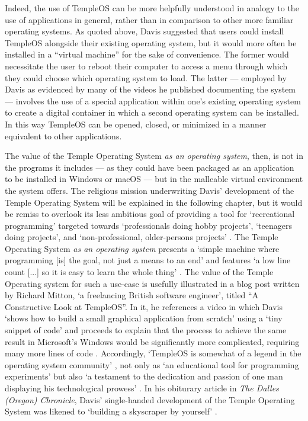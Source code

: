\documentclass[Draft.tex]{subfiles}
\begin{document}
Indeed, the use of TempleOS can be more helpfully understood in
analogy to the use of applications in general, rather than
in comparison to other more familiar operating systems.
As quoted above, Davis suggested that users could install TempleOS
alongside their existing operating system, but it would more often
be installed in a ``virtual machine'' for the sake of convenience.
The former would necessitate the user to reboot their computer
to access a menu through which they could choose which operating system to
load.
The latter --- employed by Davis as evidenced by many of the
videos he published documenting the system --- involves the use of a special
application within one's existing operating system to create a digital container
in which a second operating system can be installed.
In this way TempleOS can be opened, closed, or minimized in a manner
equivalent to other applications.

The value of the Temple Operating System \textit{as an operating system},
then, is not in the programs it includes --- as they could have
been packaged as an application to be installed in Windows or macOS ---
but in the malleable virtual environment the system offers.
The religious mission underwriting Davis' development of the
Temple Operating System will be explained in the following chapter,
but it would be remiss to overlook its less ambitious goal of providing
a tool for `recreational programming' targeted towards
`professionals doing hobby projects', `teenagers doing projects',
and `non-professional, older-persons projects' \parencite{Welcome}.
The Temple Operating System \textit{as an operating system} presents a
`simple machine where programming [is] the goal, not just a means
to an end' and features `a low line count [...]
so it is easy to learn the whole thing' \parencite{Charter}.
The value of the Temple Operating system for such a use-case is
usefully illustrated in a blog post written by Richard Mitton,
`a freelancing British software engineer', titled
``A Constructive Look at TempleOS''.
In it, he references a video in which Davis `shows how to build a small
graphical application from scratch' using a `tiny snippet of code'
and proceeds to explain that the process to achieve the same result
in Microsoft's Windows would be significantly more
complicated, requiring many more lines of code \parencite{CodersNotes}.
Accordingly, `TempleOS is somewhat of a legend in the
operating system community' \parencite{CodersNotes}, not only as
`an educational tool for programming experiments' but also
`a testament to the dedication and passion of one man
displaying his technological prowess' \parencite{TechRepublic}.
In his obiturary article in \textit{The Dalles (Oregon) Chronicle},
Davis' single-handed development of the Temple Operating System was likened to
`building a skyscraper by yourself' \parencite{Cecil18}.
\end{document}
